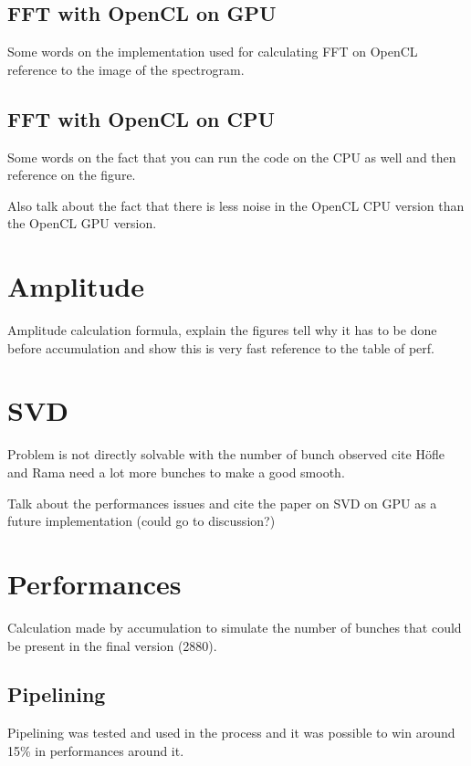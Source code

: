    \subsection{FFT with OpenCL on GPU}

   Some words on the implementation used for calculating FFT on OpenCL reference to the image of the spectrogram.

   \subsection{FFT with OpenCL on CPU}

   Some words on the fact that you can run the code on the CPU as well and then reference on the figure.

   Also talk about the fact that there is less noise in the OpenCL CPU version than the OpenCL GPU version.

\section{Amplitude}

Amplitude calculation formula, explain the figures tell why it has to be done before accumulation and show this is very fast reference to the table of perf.

\section{SVD}

Problem is not directly solvable with the number of bunch observed cite H{\"o}fle and Rama need a lot more bunches to make a good smooth\cite{calaga06}. 

Talk about the performances issues and cite the paper on SVD on GPU as a future implementation (could go to discussion?)\cite{Lahabar09}

\section{Performances}

Calculation made by accumulation to simulate the number of bunches that could be present in the final version (2880).

   \subsection{Pipelining}

	Pipelining was tested and used in the process and it was possible to win around 15\% in performances around it.

